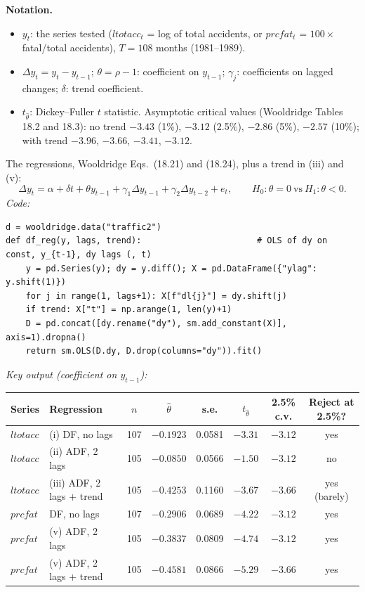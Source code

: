 \documentclass[11pt,a4paper]{article}
\newenvironment{notacao}{\par\smallskip\noindent\textbf{Notation.}\begin{itemize}[leftmargin=1.4em,topsep=1pt,itemsep=0pt]\small}{\end{itemize}}
\begin{document}
\begin{sol}
\begin{notacao}
\item $y_t$: the series tested ($ltotacc_t$ = log of total accidents, or $prcfat_t$ = $100\times$ fatal/total accidents), $T=108$ months (1981--1989).
\item $\Delta y_t=y_t-y_{t-1}$; $\theta=\rho-1$: coefficient on $y_{t-1}$; $\gamma_j$: coefficients on lagged changes; $\delta$: trend coefficient.
\item $t_{\hat\theta}$: Dickey--Fuller $t$ statistic. Asymptotic critical values (Wooldridge Tables 18.2 and 18.3):
no trend $-3.43$ (1\%), $-3.12$ (2.5\%), $-2.86$ (5\%), $-2.57$ (10\%); with trend $-3.96$, $-3.66$, $-3.41$, $-3.12$.
\end{notacao}
The regressions, Wooldridge Eqs.~(18.21) and (18.24), plus a trend in (iii) and (v):
\begin{equation}\label{q13:adf} \Delta y_t=\alpha+\delta t+\theta y_{t-1}+\gamma_1\Delta y_{t-1}+\gamma_2\Delta y_{t-2}+e_t,\qquad H_0\!:\theta=0\ \text{vs}\ H_1\!:\theta<0 . \end{equation}
\noindent\textit{Code:}
\begingroup\footnotesize
\begin{verbatim}
d = wooldridge.data("traffic2")
def df_reg(y, lags, trend):                       # OLS of dy on const, y_{t-1}, dy lags (, t)
    y = pd.Series(y); dy = y.diff(); X = pd.DataFrame({"ylag": y.shift(1)})
    for j in range(1, lags+1): X[f"dl{j}"] = dy.shift(j)
    if trend: X["t"] = np.arange(1, len(y)+1)
    D = pd.concat([dy.rename("dy"), sm.add_constant(X)], axis=1).dropna()
    return sm.OLS(D.dy, D.drop(columns="dy")).fit()
\end{verbatim}
\endgroup
\noindent\textit{Key output (coefficient on $y_{t-1}$):}
\begin{center}\small
\begin{tabular}{llcccccc}
\toprule
Series & Regression & $n$ & $\hat\theta$ & s.e. & $t_{\hat\theta}$ & 2.5\% c.v. & Reject at 2.5\%?\\
\midrule
$ltotacc$ & (i) DF, no lags & 107 & $-0.1923$ & 0.0581 & $-3.31$ & $-3.12$ & yes\\
$ltotacc$ & (ii) ADF, 2 lags & 105 & $-0.0850$ & 0.0566 & $-1.50$ & $-3.12$ & no\\
$ltotacc$ & (iii) ADF, 2 lags + trend & 105 & $-0.4253$ & 0.1160 & $-3.67$ & $-3.66$ & yes (barely)\\
$prcfat$ & DF, no lags & 107 & $-0.2906$ & 0.0689 & $-4.22$ & $-3.12$ & yes\\
$prcfat$ & (v) ADF, 2 lags & 105 & $-0.3837$ & 0.0809 & $-4.74$ & $-3.12$ & yes\\
$prcfat$ & (v) ADF, 2 lags + trend & 105 & $-0.4581$ & 0.0866 & $-5.29$ & $-3.66$ & yes\\
\bottomrule
\end{tabular}
\end{center}


\end{sol}
\end{document}
